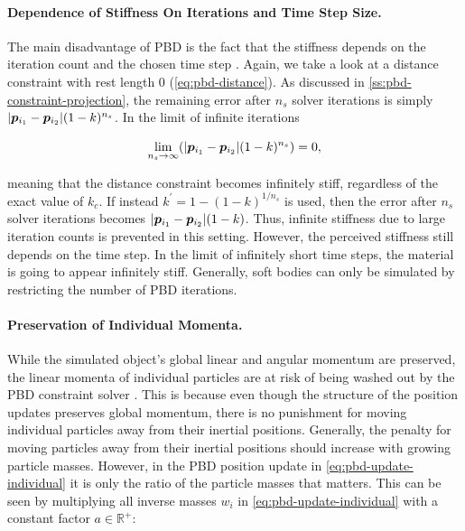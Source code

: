 \paragraph{Dependence of Stiffness On Iterations and Time Step Size.}
The main disadvantage of PBD is the fact that the stiffness depends on the iteration count and the chosen time step \cite{mueller2006}. Again, 
we take a look at
a distance constraint with rest length 0 (\cref{eq:pbd-distance}). As discussed in \cref{ss:pbd-constraint-projection}, the remaining error after
$n_s$ solver iterations is simply $\vert \bm{p}_{i_1} - \bm{p}_{i_2} \vert (1-k)^{n_s}$. In the limit of infinite iterations

\[
    \lim_{n_s \to \infty} (\vert \bm{p}_{i_1} - \bm{p}_{i_2} \vert (1-k)^{n_s}) = 0,
\]

\noindent meaning that the distance constraint becomes infinitely stiff, regardless of the exact value of $k_c$. If instead $k^{\prime}
= 1 - (1-k)^{1/n_s}$ is used, then the error after $n_s$ solver iterations becomes $\vert \bm{p}_{i_1} - \bm{p}_{i_2} \vert (1-k)$. Thus,
infinite stiffness due to large iteration counts is prevented in this setting. However, the perceived stiffness still depends on the time
step. In the limit of infinitely short time steps, the material is going to appear infinitely stiff. Generally, soft bodies can only be 
simulated by restricting the number of PBD iterations.

\paragraph{Preservation of Individual Momenta.}
While the simulated object's global linear and angular momentum are preserved, the linear momenta of individual particles are at risk of 
being washed out by the PBD constraint solver \cite{bouaziz2014}. This is because even though the structure of the position updates 
preserves global momentum, there is no punishment for moving individual particles away from their inertial positions. Generally, the 
penalty for moving particles away from their inertial positions should increase with growing particle masses. However, in the PBD
position update in \autoref{eq:pbd-update-individual} it is only the ratio of the particle masses that matters. This can be seen by multiplying
all inverse masses $w_i$ in \autoref{eq:pbd-update-individual} with a constant factor $a \in \mathbb{R}^+$:

